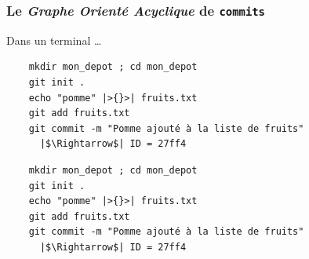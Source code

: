 \documentclass[table,tikz,12pt,svgnames]{beamer}
\begin{document}
\begin{frame}[fragile]
\frametitle{Le \textit{Graphe Orienté Acyclique} de \texttt{commits}}
 	\begin{figure}
	\end{figure}

	\begin{block}{Dans un terminal \ldots}
	\begin{overprint}
	\vspace{-0.3cm}
	\begin{semiTransparentBox}
	\begin{verbatim}
	mkdir mon_depot ; cd mon_depot
	git init .
	echo "pomme" |>{}>| fruits.txt
	git add fruits.txt
	git commit -m "Pomme ajouté à la liste de fruits"
	  |$\Rightarrow$| ID = 27ff4
	\end{verbatim}
	\end{semiTransparentBox}

	\vspace{-0.3cm}
	\begin{solidBox}
	\begin{verbatim}
	mkdir mon_depot ; cd mon_depot
	git init .
	echo "pomme" |>{}>| fruits.txt
	git add fruits.txt
	git commit -m "Pomme ajouté à la liste de fruits"
	  |$\Rightarrow$| ID = 27ff4
	\end{verbatim}
	\end{solidBox}
	\end{overprint}
	\end{block}

\end{frame}
\end{document}
